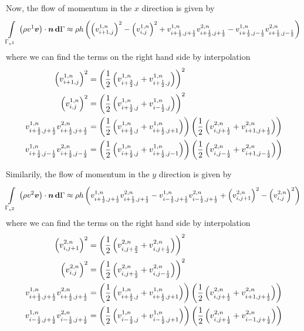 Now, the flow of momentum in the $x$ direction is given by
\begin{equation}
    \displaystyle\int\limits_{\Gamma_{v^{1}}}^{} \,\left( \rho
        v^{1}\boldsymbol{v} \right)\cdot\boldsymbol{n}\, \boldsymbol{\mathrm{d}} \Gamma \approx\rho h
  \left( \left( v^{1,n}_{i+1,j} \right)^{2}-\left( v^{1,n}_{i,j} \right)^{2}
  +v^{1,n}_{i+\frac{1}{2},j+\frac{1}{2}}v^{2,n}_{i+\frac{1}{2},j+\frac{1}{2}}
  -v^{1,n}_{i+\frac{1}{2},j-\frac{1}{2}}v^{2,n}_{i+\frac{1}{2},j-\frac{1}{2}} \right)
\end{equation}
where we can find the terms on the right hand side by interpolation \ie
\begin{equation}
  \begin{split}
    \left( v^{1,n}_{i+1,j} \right)^{2}&=\left( \frac{1}{2}\left( v^{1,n}_{i+\frac{3}{2},j}+v^{1,n}_{i+\frac{1}{2},j} \right) \right)^{2}\\
    \left( v^{1,n}_{i,j} \right)^{2}&=\left( \frac{1}{2}\left( v^{1,n}_{i+\frac{1}{2},j}+v^{1,n}_{i-\frac{1}{2},j} \right) \right)^{2}\\
    v^{1,n}_{i+\frac{1}{2},j+\frac{1}{2}}v^{2,n}_{i+\frac{1}{2},j+\frac{1}{2}}&=\left( \frac{1}{2}\left( v^{1,n}_{i+\frac{1}{2},j}+v^{1,n}_{i+\frac{1}{2},j+1} \right) \right)
    \left( \frac{1}{2}\left( v^{2,n}_{i,j+\frac{1}{2}}+v^{2,n}_{i+1,j+\frac{1}{2}} \right) \right)\\
    v^{1,n}_{i+\frac{1}{2},j-\frac{1}{2}}v^{2,n}_{i+\frac{1}{2},j-\frac{1}{2}}&=\left( \frac{1}{2}\left( v^{1,n}_{i+\frac{1}{2},j}+v^{1,n}_{i+\frac{1}{2},j-1} \right) \right)
    \left( \frac{1}{2}\left( v^{2,n}_{i,j-\frac{1}{2}}+v^{2,n}_{i+1,j-\frac{1}{2}} \right) \right)
  \end{split}
\end{equation}

Similarily, the flow of momentum in the $y$ direction is given by
\begin{equation}
    \displaystyle\int\limits_{\Gamma_{v^{2}}}^{} \,\left( \rho
        v^{2}\boldsymbol{v} \right)\cdot\boldsymbol{n}\, \boldsymbol{\mathrm{d}} \Gamma \approx\rho h\left( 
  v^{1,n}_{i+\frac{1}{2},j+\frac{1}{2}}v^{2,n}_{i+\frac{1}{2},j+\frac{1}{2}}
  -v^{1,n}_{i-\frac{1}{2},j+\frac{1}{2}}v^{2,n}_{i-\frac{1}{2},j+\frac{1}{2}}
  +\left( v^{2,n}_{i,j+1} \right)^{2}-\left( v^{2,n}_{i,j} \right)^{2} \right)
\end{equation}
where we can find the terms on the right hand side by interpolation \ie
\begin{equation}
  \begin{split}
    \left( v^{2,n}_{i,j+1} \right)^{2}&=\left( \frac{1}{2}\left( v^{2,n}_{i,j+\frac{3}{2}}+v^{2,n}_{i,j+\frac{1}{2}} \right) \right)^{2}\\
    \left( v^{2,n}_{i,j} \right)^{2}&=\left( \frac{1}{2}\left( v^{2,n}_{i,j+\frac{1}{2}}+v^{2,n}_{i,j-\frac{1}{2}} \right) \right)^{2}\\
    v^{1,n}_{i+\frac{1}{2},j+\frac{1}{2}}v^{2,n}_{i+\frac{1}{2},j+\frac{1}{2}}&=\left( \frac{1}{2}\left( v^{1,n}_{i+\frac{1}{2},j}+v^{1,n}_{i+\frac{1}{2},j+1} \right) \right)
    \left( \frac{1}{2}\left( v^{2,n}_{i,j+\frac{1}{2}}+v^{2,n}_{i+1,j+\frac{1}{2}} \right) \right)\\
    v^{1,n}_{i-\frac{1}{2},j+\frac{1}{2}}v^{2,n}_{i-\frac{1}{2},j+\frac{1}{2}}&=\left( \frac{1}{2}\left( v^{1,n}_{i-\frac{1}{2},j}+v^{1,n}_{i-\frac{1}{2},j+1} \right) \right)
    \left( \frac{1}{2}\left( v^{2,n}_{i,j+\frac{1}{2}}+v^{2,n}_{i-1,j+\frac{1}{2}} \right) \right)
  \end{split}
\end{equation}

